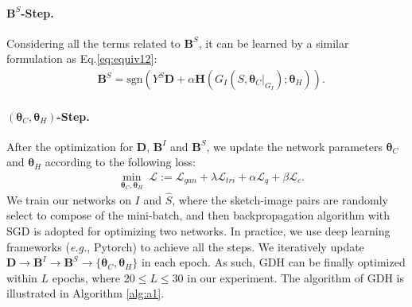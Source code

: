 \documentclass[runningheads]{llncs}
\newcommand{\sgn}{{\mathrm{sgn}}}
\begin{document}
\paragraph{$\mathbf{B}^S$-Step.} Considering all the terms related to $\mathbf{B}^S$, it can be learned by a similar formulation as Eq.\eqref{eq:equiv12}:
\begin{equation}\label{eq:equiv13}
\begin{split}
&\mathbf{B}^S = \sgn\left({Y^S}\mathbf{D}+\alpha\mathbf{H}\left ( G_I\left ( S, \bm{\theta}_C|_{G_I} \right );\bm{\theta}_H  \right )\right ).
\end{split}
\end{equation}


\paragraph{$(\bm{\theta}_C ,\bm{\theta}_H)$-Step.} After the optimization for $\mathbf{D}$, $\mathbf{B}^I$ and $\mathbf{B}^S$, we update the network parameters $\bm{\theta}_C$ and $\bm{\theta}_H$ according to the following loss:
\begin{equation}\label{eq:equiv14}
\begin{split}
&\min_{\bm{\theta}_C, \bm{\theta}_H}\;\mathcal{L} := \mathcal{L}_{gan} + \lambda\mathcal{L}_{tri} + \alpha\mathcal{L}_{q}+ \beta\mathcal{L}_{c}. %
\end{split}
\end{equation} 
We train our networks on $I$ and $\hat{S}$, where the sketch-image pairs are randomly select to compose of the mini-batch, and then backpropagation algorithm with SGD is adopted for optimizing two networks. 
In practice, we use deep learning frameworks (\emph{e.g.}, Pytorch) to achieve all the steps. We iteratively update $\mathbf{D}\rightarrow \mathbf{B}^I \rightarrow \mathbf{B}^S \rightarrow \{\bm{\theta}_C ,\bm{\theta}_H\}$ in each epoch. As such, GDH
can be finally optimized within $L$ epochs, where $20 \leq L \leq 30$ in our experiment.
The algorithm of GDH is illustrated in Algorithm \ref{alg:a1}.
\end{document}
